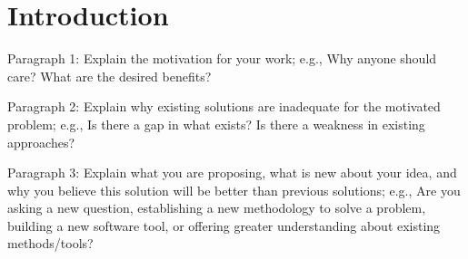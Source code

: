 \section{Introduction}

Paragraph 1: Explain the motivation for your work; e.g., Why anyone should care? What are the desired benefits? 

Paragraph 2: Explain why existing solutions are inadequate for the motivated problem; e.g., Is there a gap in what exists? Is there a weakness in existing approaches?

Paragraph 3: Explain what you are proposing, what is new about your idea, and why you believe this solution will be better than previous solutions; e.g., Are you asking a new question, establishing a new methodology to solve a problem, building a new software tool, or offering greater understanding about existing methods/tools?
